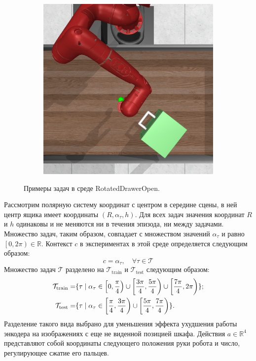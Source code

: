 \begin{figure}[h]
\begin{subfigure}{.3\textwidth}
    \end{subfigure}
    \begin{subfigure}{.3\textwidth}
        \centering
        \includegraphics[width=\linewidth]{figures/pos3.png}
    \end{subfigure}
    \caption{Примеры задач в среде RotatedDrawerOpen.}
    \label{fig:rdw}
\end{figure}

Рассмотрим полярную систему координат с центром в середине сцены, в ней центр ящика имеет координаты $(R, \alpha_{\tau}, h)$.
Для всех задач значения координат $R$ и $h$ одинаковы и не меняются ни в течения эпизода, ни между задачами.
Множество задач, таким образом, совпадает с множеством значений $\alpha_{\tau}$ и равно $\left[0, 2\pi\right) \in \mathbb{R}$.
Контекст $c$ в экспериментах в этой среде определяется следующим образом:
\begin{equation}
    c = \alpha_{\tau}, \quad \forall{\tau} \in \mathcal{T}
\end{equation}
Множество задач $\mathcal{T}$ разделено на $\mathcal{T}_{\text{train}}$ и $\mathcal{T}_{\text{test}}$ следующим образом:
\begin{align}
    \mathcal{T}_{\text{train}} = & \{\tau \mid 
    \alpha_{\tau} \in \left[0, \frac{\pi}{4}\right) \cup \left[\frac{3\pi}{4}, \frac{5\pi}{4}\right) \cup
    \left[\frac{7\pi}{4}, 2\pi\right)\};
    \notag
    \\
    \mathcal{T}_{\text{test}} = & \{\tau \mid \alpha_{\tau} \in \left[\frac{\pi}{4}, \frac{3\pi}{4}\right) \cup \left[\frac{5\pi}{4}, \frac{7\pi}{4}\right)\}.
\end{align}
Разделение такого вида выбрано для уменьшения эффекта ухудшения работы энкодера на изображениях с еще не виденной позицией шкафа.
Действия $a \in \mathbb{R}^4$ представляют собой координаты следующего положения руки робота и число, регулирующее сжатие его пальцев.

